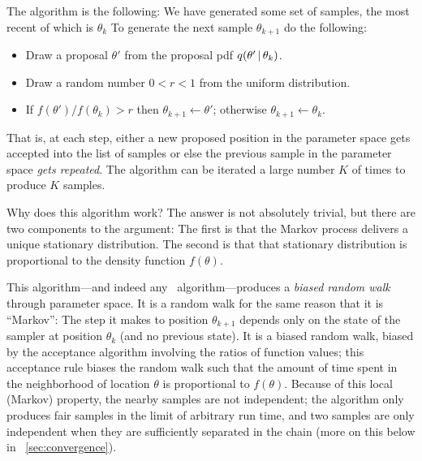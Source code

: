 \documentclass[12pt,twoside,pdftex]{article}
\newcommand{\MCMC}{\acronym{MCMC}}
\newcommand{\pars}{\theta}
\begin{document}
The algorithm is the
following: We have generated some set of samples, the most recent of
which is $\pars_k$ To generate the next sample $\pars_{k+1}$ do the
following:
\begin{itemize}
\item Draw a proposal $\pars'$ from the proposal pdf $q(\pars'\given\pars_k)$.
\item Draw a random number $0<r<1$ from the uniform distribution.
\item If $f(\pars') / f(\pars_k) > r$ then $\pars_{k+1} \leftarrow \pars'$;
      otherwise $\pars_{k+1} \leftarrow \pars_k$.
\end{itemize}
That is, at each step, either a new proposed position in the parameter
  space gets accepted into the list of samples or else the previous sample
  in the parameter space \emph{gets repeated}.
The algorithm can be iterated a large number $K$ of times to produce $K$ samples.

Why does this algorithm work?  The answer is not absolutely
trivial,
but there are two components to the argument:
The first is that the Markov process delivers a unique stationary
distribution.
The second is that that stationary distribution is proportional to the
density function $f(\pars)$.

This algorithm---and indeed any \MCMC\ algorithm---produces a
  \emph{biased random walk} through parameter space.
It is a random walk for the same reason that it is ``Markov'':
The step it makes to position $\pars_{k+1}$ depends only on the state
  of the sampler at position $\pars_k$ (and no previous state).
It is a biased random walk, biased by the acceptance algorithm
  involving the ratios of function values; this acceptance rule biases
  the random walk such that the amount of time spent in the neighborhood
  of location $\pars$ is proportional to $f(\pars)$.
Because of this local (Markov) property, the nearby samples are not
  independent; the algorithm only produces fair samples in the limit of
  arbitrary run time, and two samples are only independent when they are
  sufficiently separated in the chain (more on this below in \sectionname~\ref{sec:convergence}).
\end{document}
